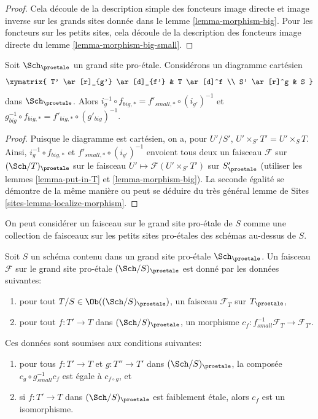\begin{proof}
Cela découle de la description simple des foncteurs image directe
et image inverse sur les grands sites donnée dans le
lemme \ref{lemma-morphism-big}. Pour les foncteurs
sur les petits sites, cela découle de la description des
foncteurs image directe du lemme \ref{lemma-morphism-big-small}.
\end{proof}

\begin{lemma}
\label{lemma-morphism-big-small-cartesian-diagram}
Soit $\Sch_\proetale$ un grand site pro-\'etale. Considérons un diagramme cartésien
$$
\xymatrix{
T' \ar[r]_{g'} \ar[d]_{f'} & T \ar[d]^f \\
S' \ar[r]^g & S
}
$$
dans $\Sch_\proetale$. Alors
$i_g^{-1} \circ f_{big, *} = f'_{small, *} \circ (i_{g'})^{-1}$
et $g_{big}^{-1} \circ f_{big, *} = f'_{big, *} \circ (g'_{big})^{-1}$.
\end{lemma}

\begin{proof}
Puisque le diagramme est cartésien, on a, pour $U'/S'$,
$U' \times_{S'} T' = U' \times_S T$. Ainsi,
$i_g^{-1} \circ f_{big, *}$ et $f'_{small, *} \circ (i_{g'})^{-1}$
envoient tous deux un faisceau $\mathcal{F}$ sur $(\Sch/T)_\proetale$ sur le faisceau
$U' \mapsto \mathcal{F}(U' \times_{S'} T')$ sur $S'_\proetale$
(utiliser les lemmes \ref{lemma-put-in-T} et \ref{lemma-morphism-big}).
La seconde égalité se démontre de la même manière ou peut se
déduire du très général
lemme de Sites \ref{sites-lemma-localize-morphism}.
\end{proof}

\noindent
On peut considérer un faisceau sur le grand site pro-\'etale de $S$ comme une collection
de faisceaux sur les petits sites pro-\'etales des schémas au-dessus de $S$.

\begin{lemma}
\label{lemma-characterize-sheaf-big}
Soit $S$ un schéma contenu dans un grand site pro-\'etale $\Sch_\proetale$.
Un faisceau $\mathcal{F}$ sur le grand site pro-\'etale $(\Sch/S)_\proetale$
est donné par les données suivantes:
\begin{enumerate}
\item pour tout $T/S \in \Ob((\Sch/S)_\proetale)$, un faisceau
$\mathcal{F}_T$ sur $T_\proetale$,
\item pour tout $f : T' \to T$ dans
$(\Sch/S)_\proetale$, un morphisme
$c_f : f_{small}^{-1}\mathcal{F}_T \to \mathcal{F}_{T'}$.
\end{enumerate}
Ces données sont soumises aux conditions suivantes:
\begin{enumerate}
\item[(a)] pour tous $f : T' \to T$ et $g : T'' \to T'$ dans
$(\Sch/S)_\proetale$, la composée
$c_g \circ g_{small}^{-1}c_f$ est égale à $c_{f \circ g}$, et
\item[(b)] si $f : T' \to T$ dans $(\Sch/S)_\proetale$
est faiblement \'etale, alors $c_f$ est un isomorphisme.
\end{enumerate}
\end{lemma}

